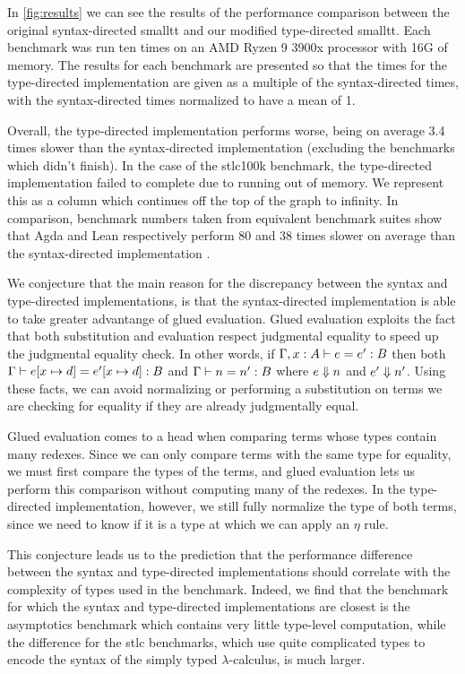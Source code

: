 In \autoref{fig:results} we can see the results of the performance comparison between the original syntax-directed smalltt and our modified type-directed smalltt.
Each benchmark was run ten times on an AMD Ryzen 9 3900x processor with 16G of memory.
The results for each benchmark are presented so that the times for the type-directed implementation are given as a multiple of the syntax-directed times, with the syntax-directed times normalized to have a mean of 1.

Overall, the type-directed implementation performs worse, being on average 3.4 times slower than the syntax-directed implementation (excluding the benchmarks which didn't finish).
In the case of the stlc100k benchmark, the type-directed implementation failed to complete due to running out of memory.
We represent this as a column which continues off the top of the graph to infinity.
In comparison, benchmark numbers taken from equivalent benchmark suites show that Agda and Lean respectively perform 80 and 38 times slower on average than the syntax-directed implementation \citep{smalltt}.

We conjecture that the main reason for the discrepancy between the syntax and type-directed implementations, is that the syntax-directed implementation is able to take greater advantange of glued evaluation.
Glued evaluation exploits the fact that both substitution and evaluation respect judgmental equality to speed up the judgmental equality check.
In other words, if $\Gamma, x : A \vdash e = e' : B$ then both $\Gamma \vdash e [x \mapsto d] = e' [x \mapsto d] : B$ and $\Gamma \vdash n = n' : B$ where $e \Downarrow n$ and $e' \Downarrow n'$.
Using these facts, we can avoid normalizing or performing a substitution on terms we are checking for equality if they are already judgmentally equal.

Glued evaluation comes to a head when comparing terms whose types contain many redexes.
Since we can only compare terms with the same type for equality, we must first compare the types of the terms, and glued evaluation lets us perform this comparison without computing many of the redexes.
In the type-directed implementation, however, we still fully normalize the type of both terms, since we need to know if it is a type at which we can apply an $\eta$ rule.

This conjecture leads us to the prediction that the performance difference between the syntax and type-directed implementations should correlate with the complexity of types used in the benchmark.
Indeed, we find that the benchmark for which the syntax and type-directed implementations are closest is the asymptotics benchmark which contains very little type-level computation, while the difference for the stlc benchmarks, which use quite complicated types to encode the syntax of the simply typed $\lambda$-calculus, is much larger.

